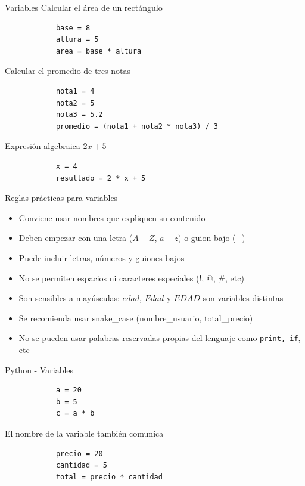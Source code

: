 \documentclass{beamer}
\begin{document}
    \begin{frame}[fragile,t]{Variables}
        Calcular el área de un rectángulo
        \begin{verbatim}
            base = 8
            altura = 5
            area = base * altura
        \end{verbatim}
        Calcular el promedio de tres notas
        \begin{verbatim}
            nota1 = 4
            nota2 = 5
            nota3 = 5.2
            promedio = (nota1 + nota2 * nota3) / 3
        \end{verbatim}
        Expresión algebraica
        $2x + 5$
        \begin{verbatim}
            x = 4
            resultado = 2 * x + 5
        \end{verbatim}
    \end{frame}

    \begin{frame}{Reglas prácticas para variables}
        \begin{itemize}
            \item Conviene usar nombres que expliquen su contenido
            \item Deben empezar con una letra ($A-Z$, $a-z$) o guion bajo (\_)
            \item Puede incluir letras, números y guiones bajos
            \item No se permiten espacios ni caracteres especiales (!, @, \#, etc)
            \item Son sensibles a mayúsculas: $edad$, $Edad$ y $EDAD$ son variables distintas
            \item Se recomienda usar snake\_case (nombre\_usuario, total\_precio)
            \item No se pueden usar palabras reservadas propias del lenguaje como \texttt{print, if}, etc
        \end{itemize}
    \end{frame}

    \begin{frame}[fragile,t]{Python - Variables}
        \begin{verbatim}
            a = 20
            b = 5
            c = a * b
        \end{verbatim}
        
        El nombre de la variable también comunica
        
        \begin{verbatim}
            precio = 20
            cantidad = 5
            total = precio * cantidad
        \end{verbatim}
    \end{frame}
\end{document}
